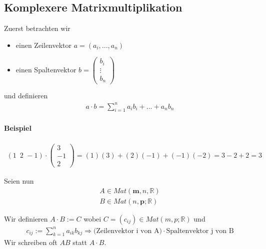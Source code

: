 \documentclass[11pt]{report}
\newcommand*\Zb[1] {\mathbb{#1}}
\newcommand*\f[1] {\textbf{#1}}
\begin{document}
\subsection{Komplexere Matrixmultiplikation}
Zuerst betrachten wir
\begin{itemize}
 \item einen Zeilenvektor $a = (a_i, ..., a_n)$
 \item einen Spaltenvektor $b = \begin{pmatrix}
                                 b_i \\ \vdots \\ b_n
                                \end{pmatrix}$
\end{itemize}
und definieren 
\begin{align}
 a\cdot b = \sum_{i=1}^{n} a_i b_i+...+a_n b_n
\end{align}
\paragraph{Beispiel}
\begin{align}
 (1\,\,\,2\,\,-1)\cdot \begin{pmatrix} 3 \\ -1 \\ 2 \end{pmatrix}
= (1)(3) + (2)(-1) + (-1)(-2) = 3-2+2 = 3
\end{align}

Seien nun
\begin{align}
 A \in Mat(\f{m}, n, \Zb{R}) \\
 B \in Mat(n, \f{p}; \Zb{R})
\end{align}

Wir definieren $A \cdot B := C$ wobei $C = (c_{ij}) \in Mat(m, p; \Zb{R})$ und 
\begin{align}
 c_{ij} := \sum_{k=1}^{n} a_{ik} b_{kj} \Rightarrow \textrm{(Zeilenvektor i von A)} \cdot \textrm{Spaltenvektor j von B}
\end{align}
Wir schreiben oft $AB$ statt $A\cdot B$.
\end{document}
